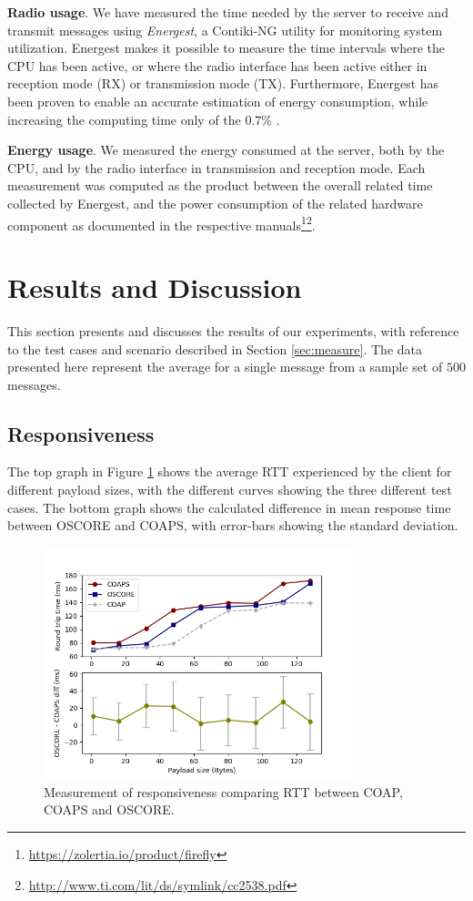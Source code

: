 {\noindent
\textbf{Radio usage}. We have measured the time needed by the server to receive and transmit messages using \emph{Energest}, a Contiki-NG utility for monitoring system utilization. Energest makes it possible to measure the time intervals where the CPU has been active, or where the radio interface has been active either in reception mode (RX) or transmission mode (TX). Furthermore, Energest has been proven to enable an accurate estimation of energy consumption, while increasing the computing time only of the $0.7\%$ \cite{energest}.

\noindent
\textbf{Energy usage}. We measured the energy consumed at the server, both by the CPU, and by the radio interface in transmission and reception mode. Each measurement was computed as the product between the overall related time collected by Energest, and the power consumption of the related hardware component as documented in the respective manuals\footnote{\url{https://zolertia.io/product/firefly}}\footnote{\url{http://www.ti.com/lit/ds/symlink/cc2538.pdf}}.

\section{Results and Discussion}
\label{sec:results}

This section presents and discusses the results of our experiments, with reference to the test cases and scenario described in Section \ref{sec:measure}. The data presented here represent the average for a single message from a sample set of $500$ messages.

\subsection{Responsiveness}
The top graph in Figure \ref{fig:rtt} shows the average RTT experienced by the client for different payload sizes, with the different curves showing the three different test cases. The bottom graph shows the calculated difference in mean response time between OSCORE and COAPS, with error-bars showing the standard deviation.

\begin{figure}[h]
\centering
\includegraphics[width=0.8\textwidth]{papers/oscore/images/rtt.png}
\caption[RTT measurements]{Measurement of responsiveness comparing RTT between COAP, COAPS and OSCORE. }
\label{fig:rtt}
\end{figure}

}
